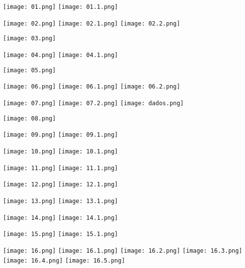 \documentclass[12pt]{report}
\begin{document}


\texttt{[image: 01.png]}
\texttt{[image: 01.1.png]}

\newpage
{}
\texttt{[image: 02.png]}
\texttt{[image: 02.1.png]}
\texttt{[image: 02.2.png]}

\newpage
{}
\texttt{[image: 03.png]}


\newpage
{}
\texttt{[image: 04.png]}
\texttt{[image: 04.1.png]}

\newpage
{}
\texttt{[image: 05.png]}

\newpage
{}
\texttt{[image: 06.png]}
\texttt{[image: 06.1.png]}
\texttt{[image: 06.2.png]}

\newpage
{}
\texttt{[image: 07.png]}
\texttt{[image: 07.2.png]}
\texttt{[image: dados.png]}

\newpage
{}
\texttt{[image: 08.png]}

\newpage
{}
\texttt{[image: 09.png]}
\texttt{[image: 09.1.png]}

\newpage
{}
\texttt{[image: 10.png]}
\texttt{[image: 10.1.png]}

\newpage
{}
\texttt{[image: 11.png]}
\texttt{[image: 11.1.png]}

\newpage
{}
\texttt{[image: 12.png]}
\texttt{[image: 12.1.png]}

\newpage
{}
\texttt{[image: 13.png]}
\newline
\texttt{[image: 13.1.png]}

\newpage
{}
\texttt{[image: 14.png]}
\newline
\texttt{[image: 14.1.png]}

\newpage
{}
\texttt{[image: 15.png]}
\texttt{[image: 15.1.png]}

\newpage
{}
\texttt{[image: 16.png]}
\newline
\texttt{[image: 16.1.png]}
\newline
\texttt{[image: 16.2.png]}
\newline
\texttt{[image: 16.3.png]}
\newline
\texttt{[image: 16.4.png]}
\newline
\texttt{[image: 16.5.png]}
\end{document}
